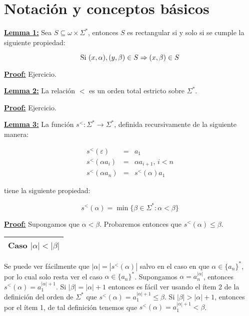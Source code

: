 \section{Notación y conceptos básicos}

  \textbf{\underline{Lemma 1:}} Sea $S\subseteq \omega \times \Sigma^{\ast}$, entonces $S$ es rectangular si y
    solo si se cumple la siguiente propiedad:

    \[
      \textup{Si } (x, \alpha), (y, \beta) \in S \Rightarrow (x, \beta) \in S
    \]

  \textbf{\underline{Proof:}} Ejercicio.

  \QED


  \textbf{\underline{Lemma 2:}} La relación $<$ es un orden total estricto sobre $\Sigma^{\ast}$.

  \textbf{\underline{Proof:}} Ejercicio.

  \QED


  \textbf{\underline{Lemma 3:}} La función $s^{<}: \Sigma^{\ast} \rightarrow \Sigma^{\ast}$, definida recursivamente
    de la siguiente manera:

    \begin{eqnarray}
  		\nonumber s^{<}(\varepsilon) &=& a_{1} \\
  		\nonumber s^{<}(\alpha a_{i}) &=& \alpha a_{i + 1} \text{, } i < n \\
  		\nonumber s^{<}(\alpha a_{n}) &=& s^{<}(\alpha) a_{1}
    \end{eqnarray}

    tiene la siguiente propiedad:

    \[
      s^{<}(\alpha) = \min \{\beta \in \Sigma^{\ast}: \alpha < \beta \}
    \]

  \textbf{\underline{Proof:}} Supongamos que $\alpha < \beta $. Probaremos entonces que $s^{<}(\alpha )\leq \beta $.

    \vspace{3mm}
    \begin{tabular}{|c|}
      \hline Caso $\left\vert \alpha \right\vert < \left\vert \beta \right\vert$\\\hline
    \end{tabular}

    \par Se puede ver fácilmente que $\left\vert \alpha \right\vert = \left\vert s^{<}(\alpha) \right\vert$ salvo en el
    caso en que $\alpha \in \{a_{n}\}^{\ast}$, por lo cual solo resta ver el caso $\alpha \in \{a_{n}\}^{\ast}$.
    Supongamos $\alpha = a_{n}^{\left\vert \alpha \right\vert}$, entonces $s^{<}(\alpha) = a_{1}^{\left\vert \alpha
    \right\vert + 1}$. Si $\left\vert \beta \right\vert = \left\vert \alpha \right\vert + 1$ entonces es fácil ver
    usando el ítem 2 de la definición del orden de $\Sigma^{\ast}$ que $s^{<}(\alpha) = a_{1}^{\left\vert \alpha
    \right\vert + 1} \leq \beta$. Si $\left\vert \beta \right\vert > \left\vert \alpha \right\vert + 1$, entonces por
    el ítem 1, de tal definición tenemos que $s^{<}(\alpha) = a_{1}^{\left\vert \alpha \right\vert +1}< \beta$.

